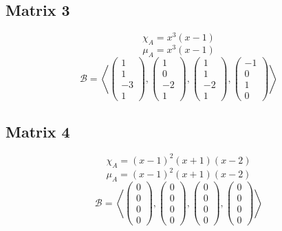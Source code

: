\documentclass[10pt,a4paper]{article}
\begin{document}
\subsection*{Matrix 3}

\begin{equation}
\chi_{A} = x^{3}(x - 1)
\end{equation}
\begin{equation}
\mu_{A} = x^{3}(x - 1)
\end{equation}
\begin{equation}
\mathcal{B} = \left \langle
\begin{pmatrix}
1\\1\\-3\\1
\end{pmatrix},
\begin{pmatrix}
1\\0\\-2\\1
\end{pmatrix},
\begin{pmatrix}
1\\1\\-2\\1
\end{pmatrix},
\begin{pmatrix}
-1\\0\\1\\0
\end{pmatrix}
\right \rangle
\end{equation}

\subsection*{Matrix 4}

\begin{equation}
\chi_{A} = (x - 1)^{2}(x + 1)(x - 2)
\end{equation}
\begin{equation}
\mu_{A} = (x - 1)^{2}(x + 1)(x - 2)
\end{equation}
\begin{equation}
\mathcal{B} = \left \langle
\begin{pmatrix}
0\\0\\0\\0
\end{pmatrix},
\begin{pmatrix}
0\\0\\0\\0
\end{pmatrix},
\begin{pmatrix}
0\\0\\0\\0
\end{pmatrix},
\begin{pmatrix}
0\\0\\0\\0
\end{pmatrix}
\right \rangle
\end{equation}
\end{document}
